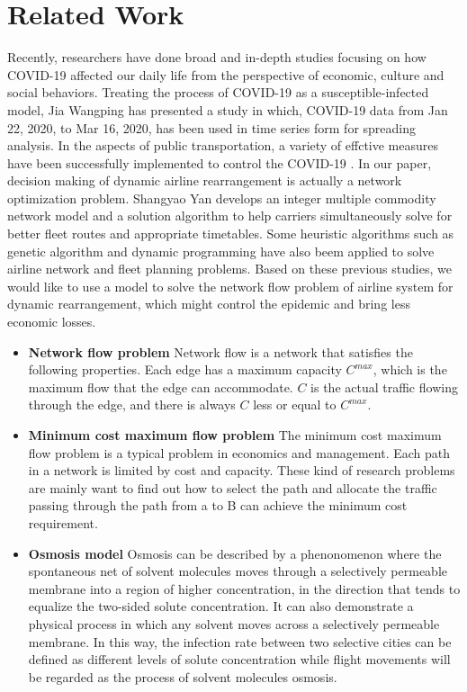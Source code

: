 
\section{Related Work}
Recently, researchers have done broad and in-depth studies focusing on how COVID-19 affected our daily life from the perspective of economic, culture and social behaviors. Treating the process of COVID-19 as a susceptible-infected model, Jia Wangping\cite{wangping2020extended} has presented a study in which, COVID-19 data from Jan 22, 2020, to Mar 16, 2020, has been used in time series form for spreading analysis. In the aspects of public transportation, a variety of effctive measures have been successfully implemented to control the COVID-19 \cite{shen2020prevention,kucharski2020early}. In our paper, decision making of dynamic airline rearrangement is actually a network optimization problem. Shangyao Yan \cite{yan2002passenger} develops an integer multiple commodity network model and a solution algorithm to help carriers simultaneously solve for better fleet routes and appropriate timetables. Some heuristic algorithms such as genetic algorithm \cite{kolker2015using} and dynamic programming \cite{khoo2014bi} have also beem applied to solve airline network and fleet planning problems. Based on these previous studies, we would like to use a model to solve the network flow problem of airline system for dynamic rearrangement, which might control the epidemic and bring less economic losses. 
\begin{itemize}
    \item \textbf{Network flow problem}
    Network flow is a network that satisfies the following properties. Each edge has a maximum capacity $C^{max}$, which is the maximum flow that the edge can accommodate. $C$ is the actual traffic flowing through the edge, and there is always $C$ less or equal to $C^{max}$.
    \item \textbf{Minimum cost maximum flow problem}
The minimum cost maximum flow problem is a typical problem in economics and management. Each path in a network is limited by cost and capacity. These kind of research problems are mainly want to find out how to select the path and allocate the traffic passing through the path from a to B can achieve the minimum cost requirement.
    \item \textbf{Osmosis model}
    Osmosis can be described by a phenonomenon where the spontaneous net of solvent molecules moves through a selectively permeable membrane into a region of higher concentration, in the direction that tends to equalize the two-sided solute concentration. It can also demonstrate a physical process in which any solvent moves across a selectively permeable membrane. In this way, the infection rate between two selective cities can be defined as different levels of solute concentration while flight movements will be regarded as the process of solvent molecules osmosis.   
\end{itemize}